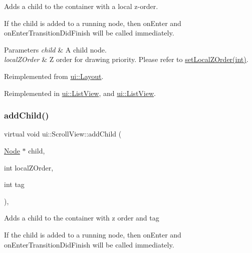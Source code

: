 Adds a child to the container with a local z-\/order.

If the child is added to a \textquotesingle{}running\textquotesingle{} node, then \textquotesingle{}on\+Enter\textquotesingle{} and \textquotesingle{}on\+Enter\+Transition\+Did\+Finish\textquotesingle{} will be called immediately.


\begin{DoxyParams}{Parameters}
{\em child} & A child node. \\
\hline
{\em local\+Z\+Order} & Z order for drawing priority. Please refer to {\ttfamily \hyperlink{classNode_aee4e616c2d55b722226aae1e68b4946f}{set\+Local\+Z\+Order(int)}}. \\
\hline
\end{DoxyParams}


Reimplemented from \hyperlink{classui_1_1Layout_a0ba6f93abe0d74d31d08147339952e19}{ui\+::\+Layout}.



Reimplemented in \hyperlink{classui_1_1ListView_afb7109d348b36c0d672066589ef1e00b}{ui\+::\+List\+View}, and \hyperlink{classui_1_1ListView_a36ef7247ab78ee7019eca8c409a30356}{ui\+::\+List\+View}.

\mbox{\label{classui_1_1ScrollView_ad0b88c4c9c3b6579167a115cd72d4d56}} 
\subsubsection{\texorpdfstring{add\+Child()}{addChild()}\hspace{0.1cm}{\footnotesize\ttfamily [7/8]}}
{\footnotesize\ttfamily virtual void ui\+::\+Scroll\+View\+::add\+Child (\begin{DoxyParamCaption}\item[{\hyperlink{classNode}{Node} $\ast$}]{child,  }\item[{int}]{local\+Z\+Order,  }\item[{int}]{tag }\end{DoxyParamCaption})\hspace{0.3cm}{\ttfamily [override]}, {\ttfamily [virtual]}}

Adds a child to the container with z order and tag

If the child is added to a \textquotesingle{}running\textquotesingle{} node, then \textquotesingle{}on\+Enter\textquotesingle{} and \textquotesingle{}on\+Enter\+Transition\+Did\+Finish\textquotesingle{} will be called immediately.



